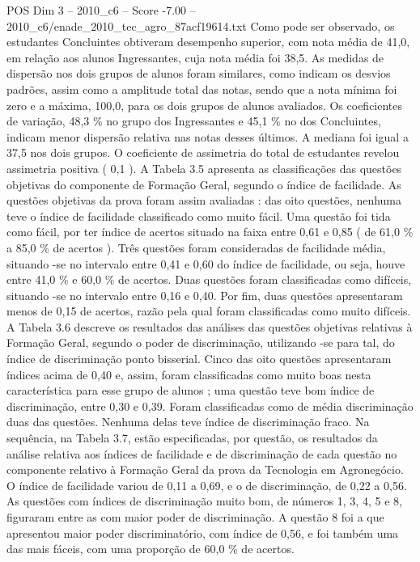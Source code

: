\begin{textsample}{POS Dim 3 – 2010\_c6 – Score -7.00 – 2010\_c6/enade\_2010\_tec\_agro\_87acf19614.txt}
Como pode ser observado, os estudantes Concluintes obtiveram desempenho superior, com nota média de 41,0, em relação aos alunos Ingressantes, cuja nota média foi 38,5.
As medidas de dispersão nos dois grupos de alunos foram similares, como indicam os desvios padrões, assim como a amplitude total das notas, sendo que a nota mínima foi zero e a máxima, 100,0, para os dois grupos de alunos avaliados.
Os coeficientes de variação, 48,3 \% no grupo dos Ingressantes e 45,1 \% no dos Concluintes, indicam menor dispersão relativa nas notas desses últimos.
A mediana foi igual a 37,5 nos dois grupos.
O coeficiente de assimetria do total de estudantes revelou assimetria positiva ( 0,1 ).
A Tabela 3.5 apresenta as classificações das questões objetivas do componente de Formação Geral, segundo o índice de facilidade.
As questões objetivas da prova foram assim avaliadas : das oito questões, nenhuma teve o índice de facilidade classificado como muito fácil.
Uma questão foi tida como fácil, por ter índice de acertos situado na faixa entre 0,61 e 0,85 ( de 61,0 \% a 85,0 \% de acertos ).
Três questões foram consideradas de facilidade média, situando -se no intervalo entre 0,41 e 0,60 do índice de facilidade, ou seja, houve entre 41,0 \% e 60,0 \% de acertos.
Duas questões foram classificadas como difíceis, situando -se no intervalo entre 0,16 e 0,40.
Por fim, duas questões apresentaram menos de 0,15 de acertos, razão pela qual foram classificadas como muito difíceis.
A Tabela 3.6 descreve os resultados das análises das questões objetivas relativas à Formação Geral, segundo o poder de discriminação, utilizando -se para tal, do índice de discriminação ponto bisserial.
Cinco das oito questões apresentaram índices acima de 0,40 e, assim, foram classificadas como muito boas nesta característica para esse grupo de alunos ; uma questão teve bom índice de discriminação, entre 0,30 e 0,39.
Foram classificadas como de média discriminação duas das questões.
Nenhuma delas teve índice de discriminação fraco.
Na sequência, na Tabela 3.7, estão especificadas, por questão, os resultados da análise relativa aos índices de facilidade e de discriminação de cada questão no componente relativo à Formação Geral da prova da Tecnologia em Agronegócio.
O índice de facilidade variou de 0,11 a 0,69, e o de discriminação, de 0,22 a 0,56.
As questões com índices de discriminação muito bom, de números 1, 3, 4, 5 e 8, figuraram entre as com maior poder de discriminação.
A questão 8 foi a que apresentou maior poder discriminatório, com índice de 0,56, e foi também uma das mais fáceis, com uma proporção de 60,0 \% de acertos.

\end{textsample}
